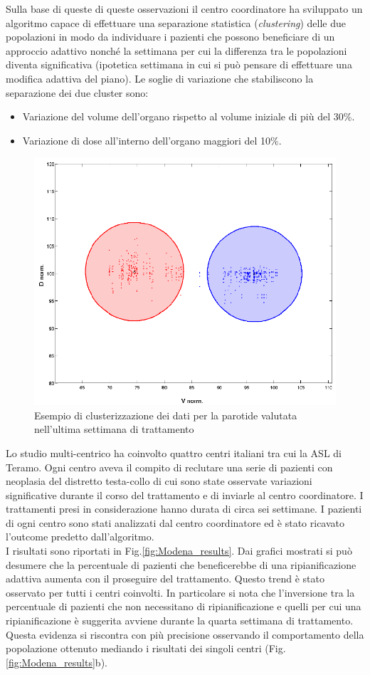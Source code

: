 Sulla base di queste di queste osservazioni il centro coordinatore ha sviluppato un algoritmo capace di effettuare una separazione statistica (\textit{clustering}) delle due popolazioni in modo da individuare i pazienti che possono beneficiare di un approccio adattivo nonché la settimana per cui la differenza tra le popolazioni diventa significativa (ipotetica settimana in cui si può pensare di effettuare una modifica adattiva del piano)\cite{Guidi2015}. Le soglie di variazione che stabiliscono la separazione dei due cluster sono:
\begin{itemize}
\item Variazione del volume dell'organo rispetto al volume iniziale di più del 30\%.
\item Variazione di dose all'interno dell'organo maggiori del 10\%.
\end{itemize}
\begin{figure}
\centering
\includegraphics[width=.7\textwidth]{./cap3/Modena_cluster.png}
\caption{Esempio di clusterizzazione dei dati per la parotide valutata nell'ultima settimana di trattamento}
\label{fig:Modena_cluster}
\end{figure}

Lo studio multi-centrico ha coinvolto quattro centri italiani tra cui la ASL di Teramo. Ogni centro aveva il compito di reclutare una serie di pazienti con neoplasia del distretto testa-collo di cui sono state osservate variazioni significative durante il corso del trattamento e di inviarle al centro coordinatore. I trattamenti presi in considerazione hanno durata di circa sei settimane. I pazienti di ogni centro sono stati analizzati dal centro coordinatore ed è stato ricavato l'outcome predetto dall'algoritmo. \\
I risultati sono riportati in Fig.\ref{fig:Modena_results}. Dai grafici mostrati si può desumere che la percentuale di pazienti che beneficerebbe di una ripianificazione adattiva aumenta con il proseguire del trattamento. Questo trend è stato osservato per tutti i centri coinvolti. In particolare si nota che l'inversione tra la percentuale di pazienti che non necessitano di ripianificazione e quelli per cui una ripianificazione è suggerita avviene durante la quarta settimana di trattamento. Questa evidenza si riscontra con più precisione osservando il comportamento della popolazione ottenuto mediando i risultati dei singoli centri (Fig.\ref{fig:Modena_results}b).

